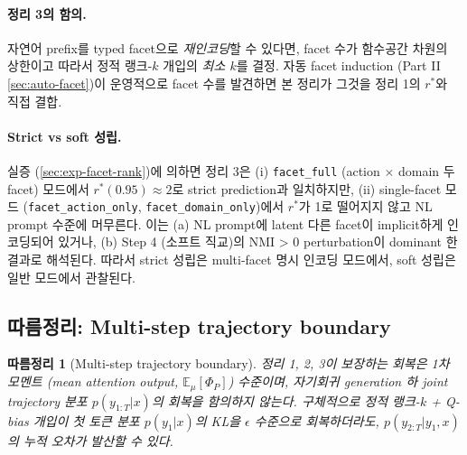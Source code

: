 \documentclass[11pt]{article}
\newtheorem{corollary}{따름정리}
\theoremstyle{definition}
\newcommand{\E}{\mathbb{E}}
\newcommand{\Phip}{\Phi_P}
\begin{document}
\paragraph{정리 3의 함의.}
자연어 prefix를 typed facet으로 \emph{재인코딩}할 수 있다면, facet 수가 함수공간 차원의 상한이고 따라서 정적 랭크-$k$ 개입의 \emph{최소 $k$}를 결정. 자동 facet induction (Part II \cref{sec:auto-facet})이 운영적으로 facet 수를 발견하면 본 정리가 그것을 정리 1의 $r^*$와 직접 결합.

\paragraph{Strict vs soft 성립.}
실증 (\cref{sec:exp-facet-rank})에 의하면 정리 3은 (i) \texttt{facet\_full} (action $\times$ domain 두 facet) 모드에서 $r^*(0.95) \approx 2$로 strict prediction과 일치하지만, (ii) single-facet 모드 (\texttt{facet\_action\_only}, \texttt{facet\_domain\_only})에서 $r^*$가 1로 떨어지지 않고 NL prompt 수준에 머무른다. 이는 (a) NL prompt에 latent 다른 facet이 implicit하게 인코딩되어 있거나, (b) Step 4 (소프트 직교)의 NMI > 0 perturbation이 dominant 한 결과로 해석된다. 따라서 strict 성립은 multi-facet 명시 인코딩 모드에서, soft 성립은 일반 모드에서 관찰된다.

\subsection{따름정리: Multi-step trajectory boundary}
\label{sec:multistep-bound}

\begin{corollary}[Multi-step trajectory boundary]
\label{cor:multistep}
정리 1, 2, 3이 보장하는 회복은 \emph{1차 모멘트} (mean attention output, $\E_\mu[\Phip]$) 수준이며, 자기회귀 generation 하 \emph{joint trajectory 분포} $p(y_{1:T} | x)$의 회복을 \emph{함의하지 않는다}. 구체적으로 정적 랭크-$k$ + Q-bias 개입이 첫 토큰 분포 $p(y_1 | x)$의 KL을 $\epsilon$ 수준으로 회복하더라도, $p(y_{2:T} | y_1, x)$의 누적 오차가 발산할 수 있다.
\end{corollary}
\end{document}
